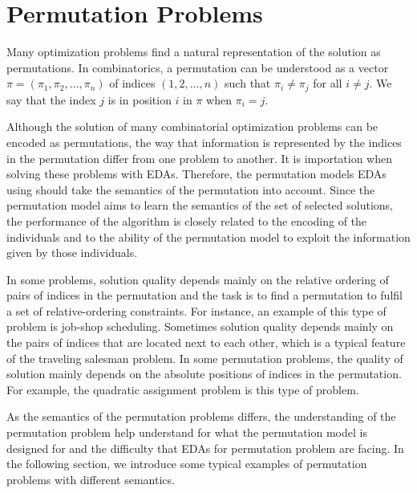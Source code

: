 \section{Permutation Problems}
\label{ch:permutation_problems}

Many optimization problems find a natural representation of the solution as permutations. In combinatorics, a permutation can be understood as a vector $\pi = (\pi_1, \pi_2,...,\pi_n)$ of indices $(1,2,...,n)$ such that $\pi_i \neq \pi_j$ for all $i \neq j$. We say that the index $j$ is in position $i$ in $\pi$ when $\pi_i = j$.

Although the solution of many combinatorial optimization problems can be encoded as permutations, the way that information is represented by the indices in the permutation  differ from one problem to another. It is importation when solving these problems with EDAs. Therefore, the permutation models EDAs using should take the semantics of the permutation into account. Since the permutation model aims to learn the semantics of the set of selected solutions, the performance of the algorithm is closely related to the encoding of the individuals and to the ability of the permutation model to exploit the information given by those individuals.

In some problems, solution quality depends mainly on the relative ordering of pairs of indices in the permutation and the task is to find a permutation to fulfil a set of relative-ordering constraints. For instance, an example of this type of problem is job-shop scheduling. Sometimes solution quality depends mainly on the pairs of indices that are located next to each other, which is a typical feature of the traveling salesman problem. In some permutation problems, the quality of solution mainly depends on the absolute positions of indices in the permutation. For example, the quadratic assignment problem is this type of problem.

As the semantics of the permutation problems differs, the understanding of the permutation problem  help understand for what the permutation model is designed for and the difficulty that EDAs for permutation problem are facing. In the following section, we introduce some typical examples of permutation problems with different semantics.

